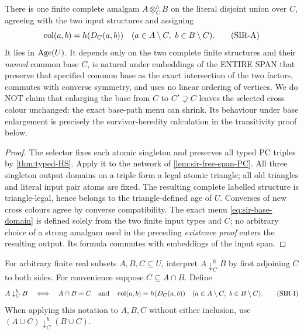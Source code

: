 \begin{proposition}
\label{prop:sir-HS-amalgam}
There is one finite complete amalgam
\(A\otimes_C^h B\) on the literal
disjoint union over \(C\), agreeing
with the two input structures and
assigning
\[
          \operatorname{col}(a,b)=h(D_C(a,b))
       \quad(a\in A\setminus C,\ b\in B\setminus C).
 \tag{SIR-A}\label{eq:sir-HS-amalgam}
\]
It lies in \(\operatorname{Age}(U)\).
It depends only on the two
complete finite structures and
their \emph{named} common base
\(C\), is natural under embeddings
of the ENTIRE SPAN that preserve
that specified common base as
the exact intersection of the
two factors, commutes with
converse symmetry, and uses
no linear ordering of vertices.
We do NOT claim that enlarging
the base from \(C\) to
\(C'\supsetneq C\) leaves the
selected cross colour unchanged:
the exact base-path menu can
shrink. Its behaviour under
base enlargement is precisely
the survivor-heredity calculation
in the transitivity proof below.
\end{proposition}
\begin{proof}
The selector fixes each atomic
singleton and preserves all
typed PC triples by
\cref{thm:typed-HS}.
Apply it to the network of
\cref{lem:sir-free-span-PC}.
All three singleton output domains
on a triple form a legal atomic
triangle; all old triangles and
literal input pair atoms are fixed.
The resulting complete labelled
structure is triangle-legal,
hence belongs to the
triangle-defined age of \(U\).
Converses of new cross colours
agree by converse compatibility.
The exact menu \eqref{eq:sir-base-domain}
is defined solely from the two
finite input types and \(C\);
no arbitrary choice of a strong
amalgam used in the preceding
\emph{existence proof} enters the
resulting output. Its formula
commutes with embeddings of the
input span.
\end{proof}

For arbitrary finite real subsets
\(A,B,C\subseteq U\), interpret
\(A\downarrow_C^h B\) by first
adjoining \(C\) to both sides.
For convenience suppose
\(C\subseteq A\cap B\). Define
\[
 A\downarrow_C^h B
 \quad\Longleftrightarrow\quad
 A\cap B=C\quad\text{and}\quad
 \operatorname{col}(a,b)=h(D_C(a,b))
 \quad(a\in A\setminus C,\ b\in B\setminus C).
 \tag{SIR-I}\label{eq:sir-independence}
\]
When applying this notation to
\(A,B,C\) without either inclusion,
use \((A\cup C)\downarrow_C^h(B\cup C)\).

